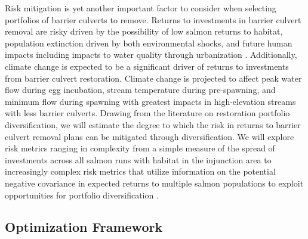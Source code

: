 \documentclass[12pt]{elsarticle}
\begin{document}
Risk mitigation is yet another important factor to consider when selecting portfolios of barrier culverts to remove. Returns to investments in barrier culvert removal are risky driven by the possibility of low salmon returns to habitat, population extinction driven by both environmental shocks, and future human impacts including impacts to water quality through urbanization \citep{ettinger2021prioritizing}. Additionally, climate change is expected to be a significant driver of returns to investments from barrier culvert restoration. Climate change is projected to affect peak water flow during egg incubation, stream temperature during pre-spawning, and minimum flow during spawning \citet{battin2007projected} with greatest impacts in high-elevation streams with less barrier culverts. Drawing from the literature on restoration portfolio diversification, we will estimate the degree to which the risk in returns to barrier culvert removal plans can be mitigated through diversification. We will explore risk metrics ranging in complexity from a simple measure of the spread of investments across all salmon runs with habitat in the injunction area to increasingly complex risk metrics that utilize information on the potential negative covariance in expected returns to multiple salmon populations to exploit opportunities for portfolio diversification \citep{sanchirico2008empirical, jardine2015fishermen, johnston2002combining}.  

\clearpage
\subsection{Optimization Framework\label{sec:opt}}
\end{document}
